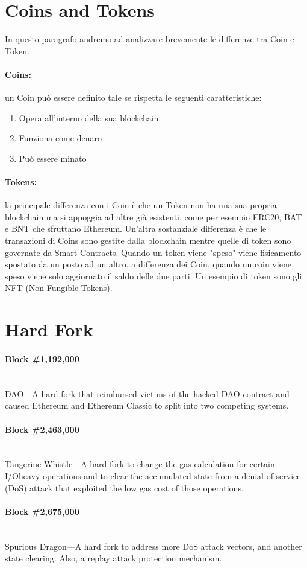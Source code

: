 \section{Coins and Tokens}
In questo paragrafo andremo ad analizzare brevemente le differenze tra Coin e Token.

\paragraph{Coins:}
un Coin può essere definito tale se rispetta le seguenti caratteristiche:

\begin{enumerate}
      \item Opera all'interno della sua blockchain
      \item Funziona come denaro
      \item Può essere minato
\end{enumerate}

\paragraph{Tokens:}
la principale differenza con i Coin è che un Token non ha una sua propria blockchain
ma si appoggia ad altre già esistenti, come per esempio ERC20, BAT e BNT che
sfruttano Ethereum. Un'altra sostanziale differenza è che le transazioni di Coins
sono gestite dalla blockchain mentre quelle di token sono governate da Smart Contracts.
Quando un token viene "speso" viene fisicamento spostato da un posto ad un altro,
a differenza dei Coin, quando un coin viene speso viene solo aggiornato il saldo
delle due parti. Un esempio di token sono gli NFT (Non Fungible Tokens).

\section{Hard Fork}

\paragraph{Block \#1,192,000} \ \\
DAO—A hard fork that reimbursed victims of the hacked DAO contract and
caused Ethereum and Ethereum Classic to split into two competing systems.

\paragraph{Block \#2,463,000} \ \\
Tangerine Whistle—A hard fork to change the gas calculation for certain I/Oheavy operations and to clear the accumulated state from a denial-of-service
(DoS) attack that exploited the low gas cost of those operations.

\paragraph{Block \#2,675,000} \ \\
Spurious Dragon—A hard fork to address more DoS attack vectors, and another
state clearing. Also, a replay attack protection mechanism.